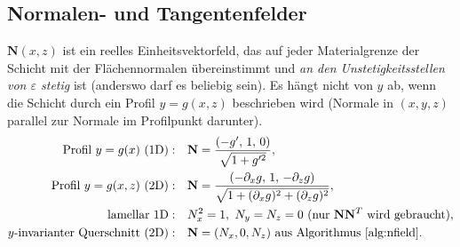 \subsection{Normalen- und Tangentenfelder}
$\mathbf N(x,z)$ ist ein reelles Einheitsvektorfeld, das auf jeder Materialgrenze der Schicht mit der
Flächennormalen übereinstimmt und \emph{an den Unstetigkeitsstellen von $\varepsilon$ stetig} ist
(anderswo darf es beliebig sein). Es hängt nicht von $y$ ab, wenn die Schicht durch ein Profil
$y=g(x,z)$ beschrieben wird (Normale in $(x,y,z)$ parallel zur Normale im Profilpunkt darunter).
\begin{align}
  \text{Profil }y=g(x)\ \text{(1D)}:\quad &\mathbf N=\frac{(-g',\,1,\,0)}{\sqrt{1+g'^2}},\label{eq:N1d}\\
  \text{Profil }y=g(x,z)\ \text{(2D)}:\quad &\mathbf N=\frac{(-\partial_xg,\,1,\,-\partial_zg)}{\sqrt{1+(\partial_xg)^2+(\partial_zg)^2}},\label{eq:N2d}\\
  \text{lamellar 1D}:\quad &N_x^2=1,\ N_y=N_z=0\ \text{(nur $\mathbf N\mathbf N^T$ wird gebraucht)},\label{eq:Nlam}\\
  \text{$y$-invarianter Querschnitt (2D)}:\quad &\mathbf N=(N_x,0,N_z)\ \text{aus Algorithmus \ref{alg:nfield}}.\notag
\end{align}
